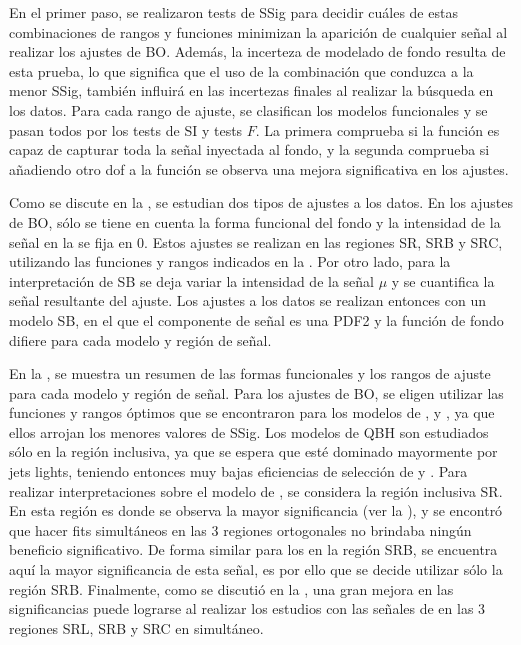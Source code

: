 En el primer paso, se realizaron tests de \ac{SSig} para decidir cuáles de estas combinaciones de rangos y funciones minimizan la aparición de cualquier señal al realizar los ajustes de \ac{BO}. Además, la incerteza de modelado de fondo resulta de esta prueba, lo que significa que el uso de la combinación que conduzca a la menor \ac{SSig}, también influirá en las incertezas finales al realizar la búsqueda en los datos. Para cada rango de ajuste, se clasifican los modelos funcionales y se pasan todos por los tests de \ac{SI} y tests \(F\). La primera comprueba si la función es capaz de capturar toda la señal inyectada al fondo, y la segunda comprueba si añadiendo otro \ac{dof} a la función se observa una mejora significativa en los ajustes.

Como se discute en la \Sect{\ref{sec:strategy:stat_treatment:fits_results}}, se estudian dos tipos de ajustes a los datos. En los ajustes de \ac{BO}, sólo se tiene en cuenta la forma funcional del fondo y la intensidad de la señal en la \Eqn{\ref{eq:strategy:stat_treatment:stat_model:likelihood}} se fija en 0. Estos ajustes se realizan en las regiones SR, SRB y SRC, utilizando las funciones y rangos indicados en la \Tab{\ref{tab:bkg:modeling:strategy_modeling:summary}}.
Por otro lado, para la interpretación de \ac{SB} se deja variar la intensidad de la señal \(\mu\) y se cuantifica la señal resultante del ajuste. Los ajustes a los datos se realizan entonces con un modelo \ac{SB}, en el que el componente de señal es una \ac{PDF2} y la función de fondo difiere para cada modelo y región de señal.

En la \Tab{\ref{tab:bkg:modeling:strategy_modeling:summary}}, se muestra un resumen de las formas funcionales y los rangos de ajuste para cada modelo y región de señal. Para los ajustes de \ac{BO}, se eligen utilizar las funciones y rangos óptimos que se encontraron para los modelos de \qstar, \bstar y \cstar, ya que ellos arrojan los menores valores de \ac{SSig}. 
Los modelos de \ac{QBH} son estudiados sólo en la región inclusiva, ya que se espera que esté dominado mayormente por jets lights, teniendo entonces muy bajas eficiencias de selección de \bjets y \cjets.
Para realizar interpretaciones sobre el modelo de \qstar, se considera la región inclusiva SR. En esta región es donde se observa la mayor significancia (ver la \Tab{\ref{tab:signals:acc_eff:qstar_signficances}}), y se encontró que hacer fits simultáneos en las 3 regiones ortogonales no brindaba ningún beneficio significativo. De forma similar para los \bstar en la región SRB, se encuentra aquí la mayor significancia de esta se\~nal, es por ello que se decide utilizar sólo la región SRB. Finalmente, como se discutió en la \Sect{\ref{sec:signals:acc_eff}}, una gran mejora en las significancias puede lograrse al realizar los estudios con las se\~nales de \cstar en las 3 regiones SRL, SRB y SRC en simultáneo.


